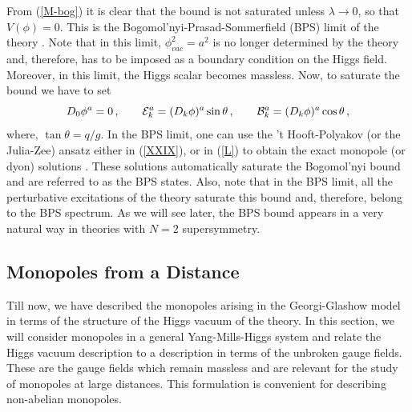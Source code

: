 From (\ref{M-bog}) it is clear that the bound is not saturated unless
$\lambda\rightarrow 0$, so that $V(\phi)=0$. This is the 
Bogomol'nyi-Prasad-Sommerfield (BPS) limit of the theory
\cite{bogomol,PS}. Note that in this limit,  $\phi_{vac}^2 =a^2$ is no
longer determined by the theory and, therefore, has to be imposed as
a boundary condition on the Higgs field. Moreover, in this limit, the
Higgs scalar becomes massless. Now, to saturate the bound we have to set 
\begin{equation}
D_0 \phi^a=0\,,\qquad {\cal E}^a_k=(D_k\phi)^a\sin\theta\,,
\qquad{\cal B}^a_k = (D_k\phi)^a\cos\theta\,,
\label{L}
\end{equation}
where, $\tan\theta=q/g$. In the BPS limit, one can use the 
't Hooft-Polyakov (or the Julia-Zee) ansatz either in (\ref{XXIX}), or
in (\ref{L}) to obtain the exact monopole (or dyon) solutions
\cite{bogomol, PS}. These solutions automatically saturate the
Bogomol'nyi bound and are referred to as the BPS states. Also, note
that in the BPS limit, all the perturbative excitations of the theory
saturate this bound and, therefore, belong to the BPS spectrum. As we
will see later, the BPS bound appears in a very natural way in
theories with $N=2$ supersymmetry. 

\subsection{Monopoles from a Distance}

Till now, we have described the monopoles arising in the
Georgi-Glashow model in terms of the structure of the  Higgs vacuum of
the theory. In this section, we will consider monopoles in a general
Yang-Mills-Higgs system and relate the Higgs vacuum description to a
description in terms of the unbroken gauge fields. These are the gauge
fields which remain massless and are relevant for the study of
monopoles at large distances. This formulation is convenient for
describing non-abelian monopoles. 

